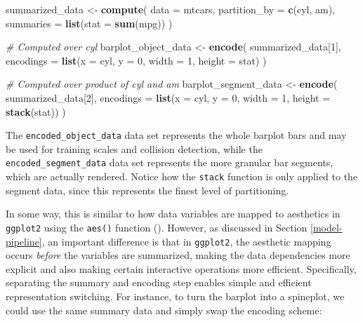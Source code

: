 \documentclass[
  openany]{book}
\newenvironment{Shaded}{\begin{snugshade}}{\end{snugshade}}
\newcommand{\AttributeTok}[1]{\textcolor[rgb]{0.13,0.29,0.53}{#1}}
\newcommand{\CommentTok}[1]{\textcolor[rgb]{0.56,0.35,0.01}{\textit{#1}}}
\newcommand{\DecValTok}[1]{\textcolor[rgb]{0.00,0.00,0.81}{#1}}
\newcommand{\FunctionTok}[1]{\textcolor[rgb]{0.13,0.29,0.53}{\textbf{#1}}}
\newcommand{\NormalTok}[1]{#1}
\newcommand{\OtherTok}[1]{\textcolor[rgb]{0.56,0.35,0.01}{#1}}
\theoremstyle{definition}
\theoremstyle{definition}
\theoremstyle{definition}
\theoremstyle{definition}
\theoremstyle{remark}
\begin{document}
\begin{Shaded}
\begin{Highlighting}[]
\NormalTok{summarized\_data }\OtherTok{\textless{}{-}} \FunctionTok{compute}\NormalTok{(}
  \AttributeTok{data =}\NormalTok{ mtcars,}
  \AttributeTok{partition\_by =} \FunctionTok{c}\NormalTok{(cyl, am),}
  \AttributeTok{summaries =} \FunctionTok{list}\NormalTok{(}\AttributeTok{stat =} \FunctionTok{sum}\NormalTok{(mpg))}
\NormalTok{  )}

\CommentTok{\# Computed over cyl}
\NormalTok{barplot\_object\_data }\OtherTok{\textless{}{-}} \FunctionTok{encode}\NormalTok{(}
\NormalTok{  summarized\_data[}\DecValTok{1}\NormalTok{],}
  \AttributeTok{encodings =} \FunctionTok{list}\NormalTok{(}\AttributeTok{x =}\NormalTok{ cyl, }\AttributeTok{y =} \DecValTok{0}\NormalTok{, }\AttributeTok{width =} \DecValTok{1}\NormalTok{, }\AttributeTok{height =}\NormalTok{ stat)}
\NormalTok{)}

\CommentTok{\# Computed over product of cyl and am}
\NormalTok{barplot\_segment\_data }\OtherTok{\textless{}{-}} \FunctionTok{encode}\NormalTok{(}
\NormalTok{  summarized\_data[}\DecValTok{2}\NormalTok{],}
  \AttributeTok{encodings =} \FunctionTok{list}\NormalTok{(}\AttributeTok{x =}\NormalTok{ cyl, }\AttributeTok{y =} \DecValTok{0}\NormalTok{, }\AttributeTok{width =} \DecValTok{1}\NormalTok{, }
                   \AttributeTok{height =} \FunctionTok{stack}\NormalTok{(stat))}
\NormalTok{)}
\end{Highlighting}
\end{Shaded}

The \texttt{encoded\_object\_data} data set represents the whole barplot bars and may be used for training scales and collision detection, while the \texttt{encoded\_segment\_data} data set represents the more granular bar segments, which are actually rendered. Notice how the \texttt{stack} function is only applied to the segment data, since this represents the finest level of partitioning.

In some way, this is similar to how data variables are mapped to aesthetics in \texttt{ggplot2} using the \texttt{aes()} function (). However, as discussed in Section \ref{model-pipeline}, an important difference is that in \texttt{ggplot2}, the aesthetic mapping occurs \emph{before} the variables are summarized, making the data dependencies more explicit and also making certain interactive operations more efficient. Specifically, separating the summary and encoding step enables simple and efficient representation switching. For instance, to turn the barplot into a spineplot, we could use the same summary data and simply swap the encoding scheme:
\end{document}
